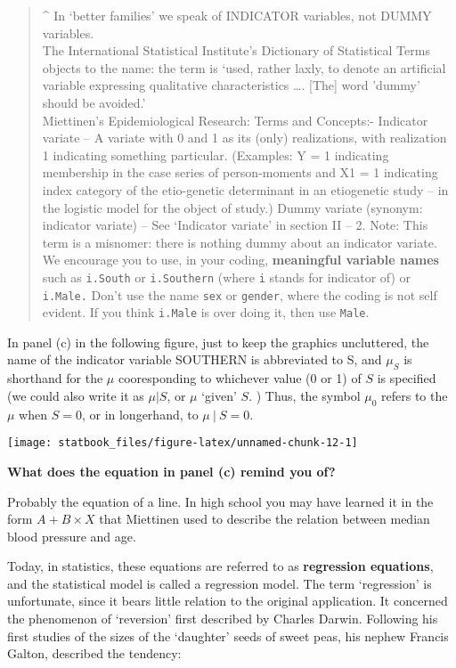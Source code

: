 \documentclass[]{book}
\begin{document}
\begin{quote}
\^{} In `better families' we speak of INDICATOR variables, not DUMMY variables.\\
The International Statistical Institute's Dictionary of Statistical Terms objects to the name: the term is `used, rather laxly, to denote an artificial variable expressing qualitative characteristics \ldots{}. {[}The{]} word 'dummy' should be avoided.'\\
Miettinen's Epidemiological Research: Terms and Concepts:- Indicator variate -- A variate with 0 and 1 as its (only) realizations, with realization 1 indicating something particular. (Examples: Y = 1 indicating membership in the case series of person-moments and X1 = 1 indicating index category of the etio-genetic determinant in an etiogenetic study -- in the logistic model for the object of study.) Dummy variate (synonym: indicator variate) -- See `Indicator variate' in section II -- 2. Note: This term is a misnomer: there is nothing dummy about an indicator variate.\\
We encourage you to use, in your coding, \textbf{meaningful variable names} such as \texttt{i.South} or \texttt{i.Southern} (where \texttt{i} stands for indicator of) or \texttt{i.Male.} Don't use the name \texttt{sex} or \texttt{gender}, where the coding is not self evident. If you think \texttt{i.Male} is over doing it, then use \texttt{Male}.
\end{quote}

In panel (c) in the following figure, just to keep the graphics uncluttered, the name of the indicator variable SOUTHERN is abbreviated to S, and \(\mu_S\) is shorthand for the \(\mu\) cooresponding to whichever value (0 or 1) of \(S\) is specified (we could also write it as \(\mu | S\), or \(\mu\) `given' \(S\). ) Thus, the symbol \(\mu_0\) refers to the \(\mu\) when \(S=0\), or in longerhand, to \(\mu \ | \ S = 0\).

\begin{center}\texttt{[image: statbook\_files/figure-latex/unnamed-chunk-12-1]} \end{center}

\textbf{What does the equation in panel (c) remind you of?}

Probably the equation of a line. In high school you may have learned it in the form \(A + B \times X\) that Miettinen used to describe the relation between median blood pressure and age.

Today, in statistics, these equations are referred to as \textbf{regression equations}, and the statistical model is called a regression model. The term `regression' is unfortunate, since it bears little relation to the original application. It concerned the phenomenon of `reversion' first described by Charles Darwin. Following his first studies of the sizes of the `daughter' seeds of sweet peas, his nephew Francis Galton, described the tendency:
\end{document}

